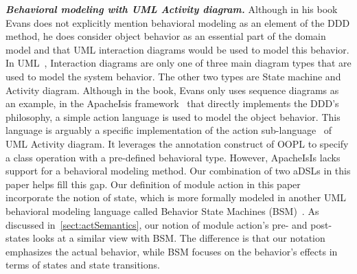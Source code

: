\textbf{\textit{Behavioral modeling with UML Activity diagram.}}
Although in his book~\cite{evans_domain-driven_2004} Evans does not explicitly mention behavioral modeling as an element of the DDD method, he does consider object behavior as an essential part of the domain model and that UML interaction diagrams would be used to model this behavior. 
%
%
%  
%
In UML~\cite[p.~285]{omg_unified_2017}, Interaction diagrams are only one of three main diagram types that are used to model the system behavior. The other two types are State machine and Activity diagram. Although in the book, Evans only uses sequence diagrams as an example, in the ApacheIsis framework~\cite{dan_haywood_apache_2013} that directly implements the DDD's philosophy, a simple action language is used to model the object behavior. This language is arguably a specific implementation of the action sub-language~\cite[p.~441]{omg_unified_2017} of UML Activity diagram. It leverages the annotation construct of OOPL to specify a class operation with a pre-defined behavioral type. However, ApacheIsIs lacks support for a behavioral modeling method. Our combination of two aDSLs in this paper helps fill this gap.
%
Our definition of module action in this paper incorporate the notion of state, which is more formally modeled in another UML behavioral modeling language called Behavior State Machines (BSM)~\cite[p.~305]{omg_unified_2017}. 
As discussed in~\ref{sect:actSemantics}, our notion of module action's pre- and post-states looks at a similar view with BSM. The difference is that our notation emphasizes the actual behavior, while BSM focuses on the behavior's effects in terms of states and state transitions.

